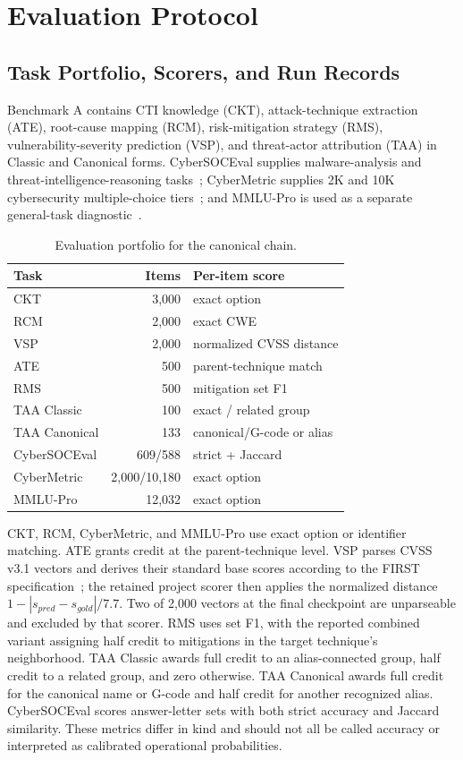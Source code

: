 \documentclass[conference]{IEEEtran}
\begin{document}
\section{Evaluation Protocol}
\subsection{Task Portfolio, Scorers, and Run Records}
Benchmark A contains CTI knowledge (CKT), attack-technique extraction (ATE), root-cause mapping (RCM), risk-mitigation strategy (RMS), vulnerability-severity prediction (VSP), and threat-actor attribution (TAA) in Classic and Canonical forms. CyberSOCEval supplies malware-analysis and threat-intelligence-reasoning tasks~\cite{deason2025cybersoceval}; CyberMetric supplies 2K and 10K cybersecurity multiple-choice tiers~\cite{tihanyi2024cybermetric}; and MMLU-Pro is used as a separate general-task diagnostic~\cite{wang2024mmlupro}.

\begin{table}[t]
\caption{Evaluation portfolio for the canonical chain.}
\label{tab:eval}
\centering
\scriptsize
\setlength{\tabcolsep}{3.2pt}
\begin{tabular}{@{}lrl@{}}
\toprule
Task & Items & Per-item score \\
\midrule
CKT & 3,000 & exact option \\
RCM & 2,000 & exact CWE \\
VSP & 2,000 & normalized CVSS distance \\
ATE & 500 & parent-technique match \\
RMS & 500 & mitigation set F1 \\
TAA Classic & 100 & exact / related group \\
TAA Canonical & 133 & canonical/G-code or alias \\
CyberSOCEval & 609/588 & strict + Jaccard \\
CyberMetric & 2,000/10,180 & exact option \\
MMLU-Pro & 12,032 & exact option \\
\bottomrule
\end{tabular}
\end{table}

CKT, RCM, CyberMetric, and MMLU-Pro use exact option or identifier matching. ATE grants credit at the parent-technique level. VSP parses CVSS v3.1 vectors and derives their standard base scores according to the FIRST specification~\cite{first2019cvss}; the retained project scorer then applies the normalized distance $1-|s_{pred}-s_{gold}|/7.7$. Two of 2,000 vectors at the final checkpoint are unparseable and excluded by that scorer. RMS uses set F1, with the reported combined variant assigning half credit to mitigations in the target technique's neighborhood. TAA Classic awards full credit to an alias-connected group, half credit to a related group, and zero otherwise. TAA Canonical awards full credit for the canonical name or G-code and half credit for another recognized alias. CyberSOCEval scores answer-letter sets with both strict accuracy and Jaccard similarity. These metrics differ in kind and should not all be called accuracy or interpreted as calibrated operational probabilities.
\end{document}
